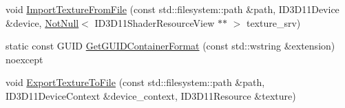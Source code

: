 \begin{DoxyCompactItemize}
\item 
void \mbox{\hyperlink{namespacemage_1_1rendering_1_1loader_a5a2ddb3f9d2c9e024e86abcde9ec7338}{Import\+Texture\+From\+File}} (const std\+::filesystem\+::path \&path, I\+D3\+D11\+Device \&device, \mbox{\hyperlink{namespacemage_a8769f9d670d6b585ea306cb1062af94b}{Not\+Null}}$<$ I\+D3\+D11\+Shader\+Resource\+View $\ast$$\ast$ $>$ texture\+\_\+srv)
\item 
static const G\+U\+ID \mbox{\hyperlink{namespacemage_1_1rendering_1_1loader_a133db87484d08ee98fc36113366f20b3}{Get\+G\+U\+I\+D\+Container\+Format}} (const std\+::wstring \&extension) noexcept
\item 
void \mbox{\hyperlink{namespacemage_1_1rendering_1_1loader_aada60eb1aa912f803c4a9fddb82776b3}{Export\+Texture\+To\+File}} (const std\+::filesystem\+::path \&path, I\+D3\+D11\+Device\+Context \&device\+\_\+context, I\+D3\+D11\+Resource \&texture)
\end{DoxyCompactItemize}
